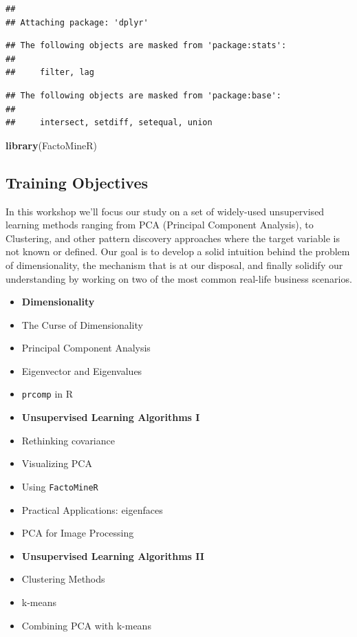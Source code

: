 \documentclass[]{article}
\newenvironment{Shaded}{\begin{snugshade}}{\end{snugshade}}
\newcommand{\KeywordTok}[1]{\textcolor[rgb]{0.13,0.29,0.53}{\textbf{#1}}}
\newcommand{\NormalTok}[1]{#1}
\begin{document}
\begin{verbatim}
## 
## Attaching package: 'dplyr'
\end{verbatim}

\begin{verbatim}
## The following objects are masked from 'package:stats':
## 
##     filter, lag
\end{verbatim}

\begin{verbatim}
## The following objects are masked from 'package:base':
## 
##     intersect, setdiff, setequal, union
\end{verbatim}

\begin{Shaded}
\begin{Highlighting}[]
\KeywordTok{library}\NormalTok{(FactoMineR)}
\end{Highlighting}
\end{Shaded}

\hypertarget{training-objectives}{%
\subsection{Training Objectives}\label{training-objectives}}

In this workshop we'll focus our study on a set of widely-used
unsupervised learning methods ranging from PCA (Principal Component
Analysis), to Clustering, and other pattern discovery approaches where
the target variable is not known or defined. Our goal is to develop a
solid intuition behind the problem of dimensionality, the mechanism that
is at our disposal, and finally solidify our understanding by working on
two of the most common real-life business scenarios.

\begin{itemize}
\item
  \textbf{Dimensionality}
\item
  The Curse of Dimensionality\\
\item
  Principal Component Analysis\\
\item
  Eigenvector and Eigenvalues\\
\item
  \texttt{prcomp} in R
\item
  \textbf{Unsupervised Learning Algorithms I}
\item
  Rethinking covariance\\
\item
  Visualizing PCA
\item
  Using \texttt{FactoMineR}
\item
  Practical Applications: eigenfaces
\item
  PCA for Image Processing
\item
  \textbf{Unsupervised Learning Algorithms II}
\item
  Clustering Methods
\item
  k-means\\
\item
  Combining PCA with k-means
\end{itemize}
\end{document}
